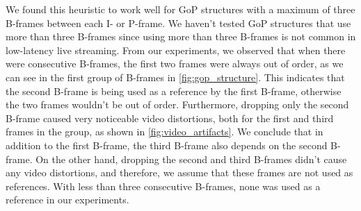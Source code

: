 We found this heuristic to work well for \ac{GoP} structures with a maximum of three B-frames between each I-  or P-frame. We haven't tested \ac{GoP} structures that use more than three B-frames since using more than three B-frames is not common in low-latency live streaming. From our experiments, we observed that when there were consecutive B-frames, the first two frames were always out of order, as we can see in the first group of B-frames in \autoref{fig:gop_structure}. This indicates that the second B-frame is being used as a reference by the first B-frame, otherwise the two frames wouldn't be out of order. Furthermore, dropping only the second B-frame caused very noticeable video distortions, both for the first and third frames in the group, as shown in \autoref{fig:video_artifacts}. We conclude that in addition to the first B-frame, the third B-frame also depends on the second B-frame. On the other hand, dropping the second and third B-frames didn't cause any video distortions, and therefore, we assume that these frames are not used as references. With less than three consecutive B-frames, none was used as a reference in our experiments.


